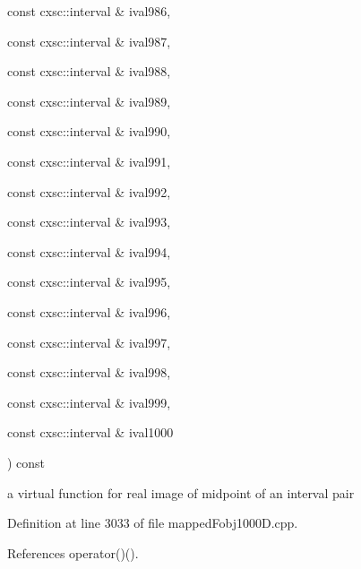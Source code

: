 {{\begin{DoxyParamCaption}
\item[{const cxsc\-::interval \&}]{ival986, }
\item[{const cxsc\-::interval \&}]{ival987, }
\item[{const cxsc\-::interval \&}]{ival988, }
\item[{const cxsc\-::interval \&}]{ival989, }
\item[{const cxsc\-::interval \&}]{ival990, }
\item[{const cxsc\-::interval \&}]{ival991, }
\item[{const cxsc\-::interval \&}]{ival992, }
\item[{const cxsc\-::interval \&}]{ival993, }
\item[{const cxsc\-::interval \&}]{ival994, }
\item[{const cxsc\-::interval \&}]{ival995, }
\item[{const cxsc\-::interval \&}]{ival996, }
\item[{const cxsc\-::interval \&}]{ival997, }
\item[{const cxsc\-::interval \&}]{ival998, }
\item[{const cxsc\-::interval \&}]{ival999, }
\item[{const cxsc\-::interval \&}]{ival1000}
\end{DoxyParamCaption}
) const}}\label{classsubpavings_1_1MappedFobj1000D_a669894e5a1399345b2b652977d063c2e}


a virtual function for real image of midpoint of an interval pair 



\-Definition at line 3033 of file mapped\-Fobj1000\-D.\-cpp.



\-References operator()().


